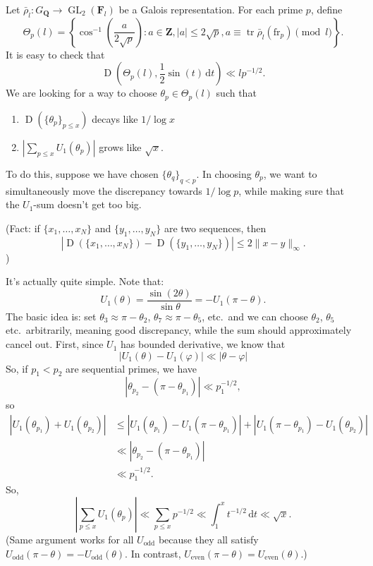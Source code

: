 \documentclass{article}
\DeclareMathOperator{\disc}{D}
\DeclareMathOperator{\GL}{GL}
\DeclareMathOperator{\tr}{tr}
\newcommand{\bF}{\mathbf{F}}
\newcommand{\bQ}{\mathbf{Q}}
\newcommand{\bZ}{\mathbf{Z}}
\newcommand{\dd}{\mathrm{d}}
\newcommand{\even}{\mathrm{even}}
\newcommand{\fr}{\mathrm{fr}}
\newcommand{\odd}{\mathrm{odd}}
\begin{document}
Let $\bar\rho_l\colon G_\bQ \to \GL_2(\bF_l)$ be a Galois representation. For 
each prime $p$, define 
\[
	\Theta_p(l) = \left\{\cos^{-1}\left(\frac{a}{2\sqrt p}\right) : a\in \bZ, |a|\leqslant 2\sqrt p, a \equiv \tr \bar\rho_l(\fr_p)\pmod l\right\} .
\]
It is easy to check that 
\[
	\disc\left(\Theta_p(l),\frac 1 2 \sin(t)\, \dd t\right) \ll l p^{-1/2} .
\]
We are looking for a way to choose $\theta_p\in \Theta_p(l)$ such that 
\begin{enumerate}
\item
$\disc(\{\theta_p\}_{p\leqslant x})$ decays like $1/\log x$

\item
$\left| \sum_{p\leqslant x} U_1(\theta_p)\right|$ grows like 
$\sqrt x$. 
\end{enumerate}
To do this, suppose we have chosen $\{\theta_q\}_{q < p}$. In choosing 
$\theta_p$, we want to simultaneously move the discrepancy towards 
$1/\log p$, while making sure that the $U_1$-sum doesn't get too big. 

(Fact: if $\{x_1,\dots,x_N\}$ and $\{y_1,\dots,y_N\}$ are two sequences, 
then 
\[
	|\disc(\{x_1,\dots,x_N\}) - \disc(\{y_1,\dots,y_N\})| \leqslant 2\|x-y\|_\infty .
\]
)

It's actually quite simple. Note that:
\[
	U_1(\theta) = \frac{\sin(2\theta)}{\sin\theta} = -U_1(\pi-\theta) .
\]
The basic idea is: set $\theta_3 \approx \pi-\theta_2$, 
$\theta_7 \approx \pi-\theta_5$, etc.~and we can choose $\theta_2$, 
$\theta_5$ etc.~arbitrarily, meaning good discrepancy, while the sum should 
approximately cancel out. First, since $U_1$ has bounded derivative, we know 
that 
\[
	|U_1(\theta) - U_1(\varphi)| \ll |\theta-\varphi|
\]
So, if $p_1<p_2$ are sequential primes, we have 
\[
	|\theta_{p_2} - (\pi-\theta_{p_1})| \ll p_1^{-1/2} ,
\]
so 
\begin{align*}
	|U_1(\theta_{p_1}) + U_1(\theta_{p_2})| 
		&\leqslant |U_1(\theta_{p_1}) - U_1(\pi - \theta_{p_1})| + |U_1(\pi-\theta_{p_1}) - U_1(\theta_{p_2})| \\
		&\ll |\theta_{p_2} - (\pi-\theta_{p_1})| \\
		&\ll p_1^{-1/2} .
\end{align*}
So, 
\[
	\left| \sum_{p\leqslant x} U_1(\theta_p) \right| \ll \sum_{p\leqslant x} p^{-1/2} \ll \int_1^x t^{-1/2} \, \dd t \ll \sqrt x .
\]
(Same argument works for all $U_\odd$ because they all satisfy 
$U_\odd(\pi-\theta) = -U_\odd(\theta)$. In contrast, 
$U_\even(\pi-\theta) = U_\even(\theta)$.)
\end{document}
